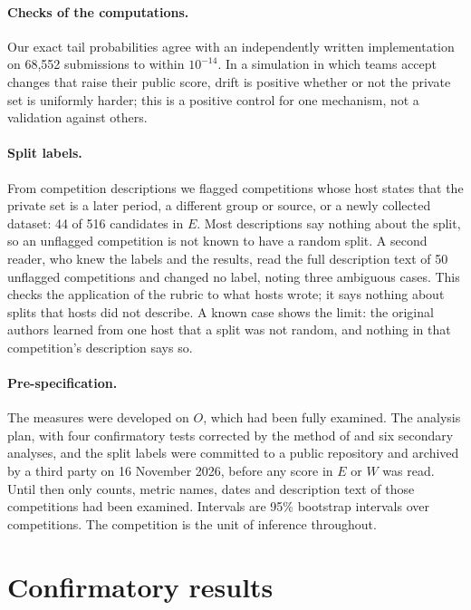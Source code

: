 \documentclass[10pt]{article}
\begin{document}
\paragraph{Checks of the computations.} Our exact tail probabilities agree with an independently written implementation on 68,552 submissions to within $10^{-14}$. In a simulation in which teams accept changes that raise their public score, drift is positive whether or not the private set is uniformly harder; this is a positive control for one mechanism, not a validation against others.

\paragraph{Split labels.} From competition descriptions we flagged competitions whose host states that the private set is a later period, a different group or source, or a newly collected dataset: 44 of 516 candidates in $E$. Most descriptions say nothing about the split, so an unflagged competition is not known to have a random split. A second reader, who knew the labels and the results, read the full description text of 50 unflagged competitions and changed no label, noting three ambiguous cases. This checks the application of the rubric to what hosts wrote; it says nothing about splits that hosts did not describe. A known case shows the limit: the original authors learned from one host that a split was not random, and nothing in that competition's description says so.

\paragraph{Pre-specification.} The measures were developed on $O$, which had been fully examined. The analysis plan, with four confirmatory tests corrected by the method of \citet{holm1979} and six secondary analyses, and the split labels were committed to a public repository and archived by a third party on 16 November 2026, before any score in $E$ or $W$ was read. Until then only counts, metric names, dates and description text of those competitions had been examined. Intervals are 95\% bootstrap intervals over competitions. The competition is the unit of inference throughout.

\section{Confirmatory results}
\label{sec:confirm}
\end{document}
